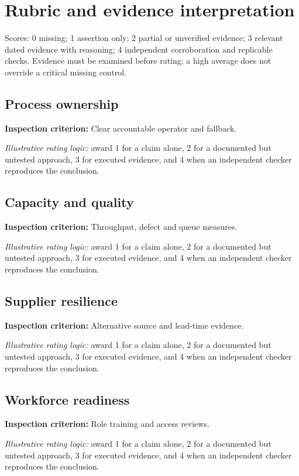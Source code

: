 \documentclass[11pt]{article}
\begin{document}
\SuiteOpen
\section{Rubric and evidence interpretation}
Scores: 0 missing; 1 assertion only; 2 partial or unverified evidence; 3 relevant dated evidence with reasoning; 4 independent corroboration and replicable checks. Evidence must be examined before rating; a high average does not override a critical missing control.
\subsection*{Process ownership}
\textbf{Inspection criterion:} Clear accountable operator and fallback.\par\textit{Illustrative rating logic:} award 1 for a claim alone, 2 for a documented but untested approach, 3 for executed evidence, and 4 when an independent checker reproduces the conclusion.\par
\subsection*{Capacity and quality}
\textbf{Inspection criterion:} Throughput, defect and queue measures.\par\textit{Illustrative rating logic:} award 1 for a claim alone, 2 for a documented but untested approach, 3 for executed evidence, and 4 when an independent checker reproduces the conclusion.\par
\subsection*{Supplier resilience}
\textbf{Inspection criterion:} Alternative source and lead-time evidence.\par\textit{Illustrative rating logic:} award 1 for a claim alone, 2 for a documented but untested approach, 3 for executed evidence, and 4 when an independent checker reproduces the conclusion.\par
\subsection*{Workforce readiness}
\textbf{Inspection criterion:} Role training and access reviews.\par\textit{Illustrative rating logic:} award 1 for a claim alone, 2 for a documented but untested approach, 3 for executed evidence, and 4 when an independent checker reproduces the conclusion.\par
\end{document}
